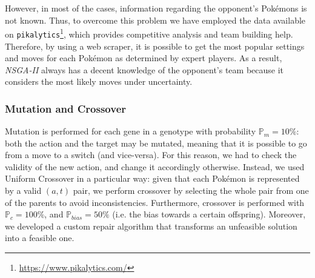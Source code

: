 However, in most of the cases, information regarding the opponent's Pokémons is not known. Thus, to overcome this problem we have employed the data available on \texttt{pikalytics}\footnote{\url{https://www.pikalytics.com/}}, which provides competitive analysis and team building help. Therefore, by using a web scraper, it is possible to get the most popular settings and moves for each Pokémon as determined by expert players. As a result, \emph{NSGA-II} always has a decent knowledge of the opponent's team because it considers the most likely moves under uncertainty.

\subsubsection{Mutation and Crossover}
Mutation is performed for each gene in a genotype with  probability $\mathbb{P}_m = 10\%$: both the action and the target may be mutated, meaning that it is possible to go from a move to a switch (and vice-versa). For this reason, we had to check the validity of the new action, and change it accordingly otherwise.
Instead, we used Uniform Crossover in a particular way: given that each Pokémon is represented by a valid $(a, t)$ pair, we perform crossover by selecting the whole pair from one of the parents to avoid inconsistencies. Furthermore, crossover is performed with $\mathbb{P}_c = 100\%$, and $\mathbb{P}_{bias} = 50\%$ (i.e. the bias towards a certain offspring). Moreover, we developed a custom repair algorithm that transforms an unfeasible solution into a feasible one.

